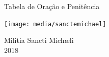 \documentclass[paper=a5,10pt,openany]{scrbook}
\begin{document}

\begin{titlepage}
\begin{center}
\vspace*{2.5cm}
\Huge{Tabela de Oração e Penitência}\\

\vspace*{1cm}

\texttt{[image: media/sanctemichael]}
\vspace*{1cm}

\Large{\redx Militia Sancti Michæli}\\
\large{2018}\\

\end{center}
\end{titlepage}
\end{document}
